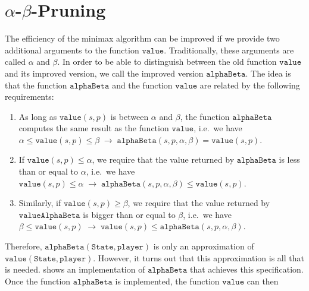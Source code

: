 \section{$\alpha$-$\beta$-Pruning}
The efficiency of the minimax algorithm can be improved if we provide two additional arguments to the function
$\texttt{value}$.  Traditionally, these arguments are called $\alpha$ and $\beta$.  In order to be able to
distinguish between the old function $\texttt{value}$ and its improved version, we call the improved version 
$\texttt{alphaBeta}$.  The idea is that the function $\texttt{alphaBeta}$ and the function $\texttt{value}$ are
related by the following requirements: 
\begin{enumerate}
\item As long as $\texttt{value}(s, p)$ is between $\alpha$ and $\beta$, the function
      $\texttt{alphaBeta}$ computes the same result as the function $\texttt{value}$,
      i.e.~we have
      \\[0.2cm]
      \hspace*{0.3cm}
      $\alpha \leq \texttt{value}(s, p) \leq \beta \;\rightarrow\;
         \texttt{alphaBeta}(s, p, \alpha, \beta) = \texttt{value}(s,p)
      $.
\item If $\texttt{value}(s, p) \leq \alpha$, we require that the value returned by
      $\texttt{alphaBeta}$ is less than or equal to $\alpha$, i.e.~we have 
      \\[0.2cm]
      \hspace*{0.3cm}
      $\texttt{value}(s, p) \leq \alpha \;\rightarrow\; \texttt{alphaBeta}(s, p, \alpha, \beta) \leq
      \mathtt{value}(s, p)$.
\item Similarly, if $\texttt{value}(s, p) \geq \beta$, we require that the value
      returned by $\texttt{valueAlphaBeta}$ is bigger than or equal to $\beta$, i.e.~we have 
      \\[0.2cm]
      \hspace*{0.3cm}
      $\beta \leq \texttt{value}(s, p) \;\rightarrow\; \mathtt{value}(s, p) \leq \texttt{alphaBeta}(s, p, \alpha, \beta)$.
\end{enumerate}
Therefore, $\texttt{alphaBeta}(\texttt{State}, \texttt{player})$  is only an approximation of
$\texttt{value}(\texttt{State}, \texttt{player})$.  However, it turns out that this approximation is all that
is needed.   shows an implementation of $\texttt{alphaBeta}$ that achieves this
specification.  Once the function $\texttt{alphaBeta}$ is implemented, the function $\texttt{value}$ can then
